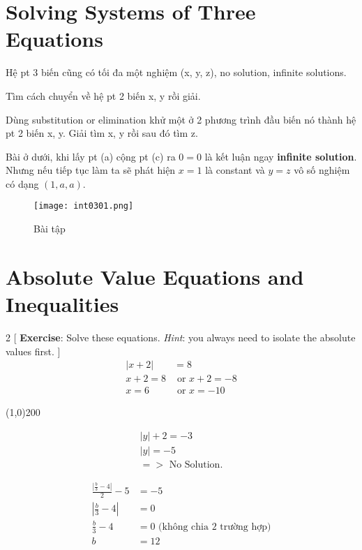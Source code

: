 \section{Solving Systems of Three Equations}

Hệ pt 3 biến cũng có tối đa một nghiệm (x, y, z), no solution, infinite solutions.

Tìm cách chuyển về hệ pt 2 biến x, y rồi giải.

Dùng substitution or elimination khử một ở 2 phương trình đầu biến nó thành hệ pt 2 biến x, y. Giải tìm x, y rồi sau đó tìm z.

\vspace{.4cm}

Bài ở dưới, khi lấy pt (a) cộng pt (c) ra $0=0$ là kết luận ngay \textbf{infinite solution}. Nhưng nếu tiếp tục làm ta sẽ phát hiện $x=1$ là constant và $y=z$ vô số nghiệm có dạng $(1, a, a)$.

\begin{figure}[htb!]
  \centering
  \texttt{[image: int0301.png]}
  \caption{Bài tập}
\end{figure}

\section{Absolute Value Equations and Inequalities}

\begin{multicols}{2}
[
  \textbf{Exercise}: Solve these equations. \textit{Hint}: you always need to isolate the absolute values first.
]
\begin{equation*}
\begin{split}
  |x+2| &= 8 \\
  x+2=8 &\text{ or } x+2=-8\\
  x=6 &\text{ or } x=-10
\end{split}
\end{equation*}

\begin{center} \line(1,0){200} \end{center}

\begin{align*} 
|y|+2=-3\\
|y| = -5\\
  =>\text{ No Solution.}
\end{align*}

\begin{align*} 
  \frac{\left| \frac{b}{3}-4 \right|}{2} -5 &=-5\\
  \left| \frac{b}{3}-4 \right| &= 0 \\
  \frac{b}{3}-4 &=0 \text{ (không chia 2 trường hợp)}\\
  b&=12
\end{align*}

\end{multicols}

